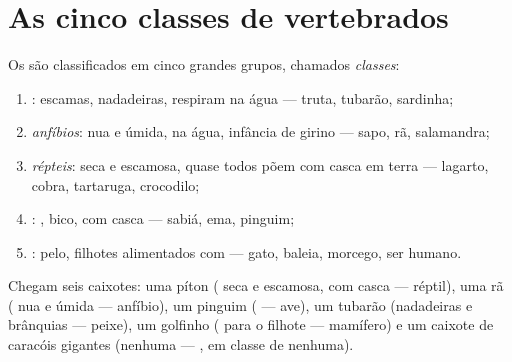 \section{As cinco classes de vertebrados}

\begin{proposition}\label{prop:g4:classifying-animals:classes}
Os  são classificados em cinco grandes grupos, chamados
\emph{classes}:
\begin{enumerate}
  \item \emph{}: escamas, nadadeiras, respiram na água ---
        truta, tubarão, sardinha;
  \item \emph{anfíbios}:  nua e úmida,  na
        água, infância de girino --- sapo, rã, salamandra;
  \item \emph{répteis}:  seca e escamosa, quase
        todos põem  com casca em terra --- lagarto, cobra,
        tartaruga, crocodilo;
  \item \emph{}: , bico,  com casca --- sabiá, ema,
        pinguim;
  \item \emph{}: pelo, filhotes alimentados com  ---
        gato, baleia, morcego, ser humano.
\end{enumerate}
\end{proposition}
\admitted

\begin{example}\label{ex:g4:classifying-animals:zoo}
Chegam seis caixotes: uma píton ( seca e escamosa,  com
casca --- réptil), uma rã ( nua e úmida --- anfíbio), um pinguim
( --- ave), um tubarão (nadadeiras e brânquias --- peixe), um
golfinho ( para o filhote --- mamífero) e um caixote de
caracóis gigantes (nenhuma  --- , em
classe de  nenhuma).
\end{example}

